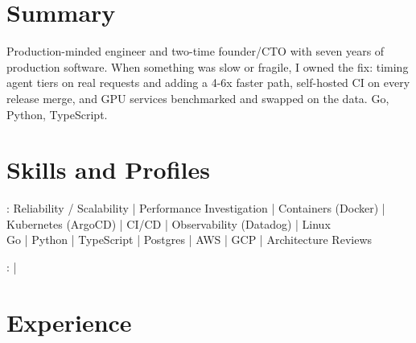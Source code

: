\documentclass[print]{jack-resume}
\begin{document}
\pagecolor{darkmodeBackground}


\begin{minipage}[t][1cm][t]{.03\textwidth}
    \hfill
\end{minipage}

\section{Summary}
Production-minded engineer and two-time founder/CTO with seven years of production software. When something was slow or fragile, I owned the fix: timing agent tiers on real requests and adding a 4-6x faster path, self-hosted CI on every release merge, and GPU services benchmarked and swapped on the data. Go, Python, TypeScript.
\sectionsep

\section{Skills and Profiles}
:
Reliability / Scalability \hfill | \hfill
Performance Investigation \hfill | \hfill
Containers (Docker) \hfill | \hfill
Kubernetes (ArgoCD) \hfill | \hfill
CI/CD \hfill | \hfill
Observability (Datadog) \hfill | \hfill
Linux \\
\hspace{1.0cm} Go \hfill | \hfill
Python \hfill | \hfill
TypeScript \hfill | \hfill
Postgres \hfill | \hfill
AWS \hfill | \hfill
GCP \hfill | \hfill
Architecture Reviews \\

\raggedright{
    :
      \href{https://www.linkedin.com/in/jack-sturtevant/}{ \ExternalLink} |
     \href{https://github.com/jacksturt}{ \ExternalLink}}

\section{Experience}
\end{document}
